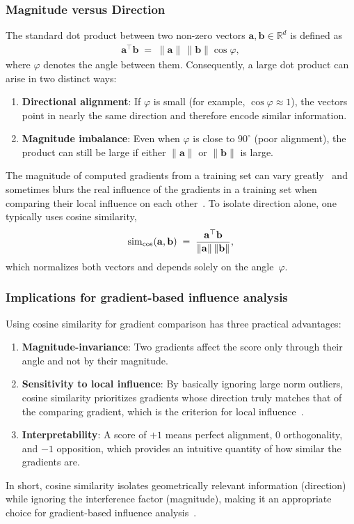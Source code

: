 \subsubsection{Magnitude versus Direction}
The standard dot product between two non-zero vectors
$\mathbf{a},\mathbf{b}\in\mathbb{R}^d$ is defined as
\begin{align*}
    \mathbf{a}^{\top}\mathbf{b}
    \;=\;
    \|\mathbf{a}\|\,\|\mathbf{b}\|\cos{\varphi},
\end{align*}
where $\varphi$ denotes the angle between them. Consequently, a large dot product can arise in two distinct ways:
\begin{enumerate}
    \item \textbf{Directional alignment}: If $\varphi$ is small (for example, $\cos{\varphi} \approx 1$), the vectors point in nearly the same direction and therefore encode similar information.
    \item \textbf{Magnitude imbalance}: Even when $\varphi$ is close to $90^{\circ}$ (poor alignment), the product can still be large if either $\|\mathbf{a}\|$ or $\|\mathbf{b}\|$ is large.
\end{enumerate}
The magnitude of computed gradients from a training set can vary greatly~\cite{DBLP:conf/nips/SuiWS21} and sometimes blurs the real influence of the gradients in a training set when comparing their local influence on each other~\cite{DBLP:journals/corr/abs-2003-11630}. To isolate direction alone, one typically uses cosine similarity,
\begin{align*}
    \operatorname{sim}_{\cos}(\mathbf{a},\mathbf{b})
    \;=\;
    \frac{\mathbf{a}^{\top}\mathbf{b}}
         {\|\mathbf{a}\|\,\|\mathbf{b}\|},
\end{align*}
which normalizes both vectors and depends solely on the angle~$\varphi$.

\subsubsection{Implications for gradient-based influence analysis}
Using cosine similarity for gradient comparison has three practical advantages:
\begin{enumerate}
    \item \textbf{Magnitude-invariance}: Two gradients affect the score only through their angle and not by their magnitude.
    \item \textbf{Sensitivity to local influence}: By basically ignoring large norm outliers, cosine similarity prioritizes gradients whose direction truly matches that of the comparing gradient, which is the criterion for local influence~\cite{DBLP:journals/corr/abs-2003-11630}.
    \item \textbf{Interpretability}: A score of $+1$ means perfect alignment, $0$ orthogonality, and $-1$ opposition, which provides an intuitive quantity of how similar the gradients are.
\end{enumerate}
In short, cosine similarity isolates geometrically relevant information (direction) while
ignoring the interference factor (magnitude), making it an appropriate choice for
gradient-based influence analysis~\cite{DBLP:journals/ml/HammoudehL24}.

